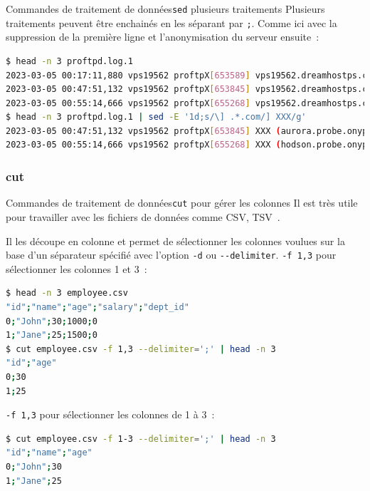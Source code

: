 \documentclass{beamer}
\begin{document}
    \begin{frame}[fragile]{Commandes de traitement de données}{\lstinline{sed} plusieurs traitements}
        Plusieurs traitements peuvent être enchainés en les séparant par \lstinline{;}.
        Comme ici avec la suppression de la première ligne et l'anonymisation du serveur ensuite~:
        \begin{lstlisting}[language=bash,basicstyle=\tiny\ttfamily]
$ head -n 3 proftpd.log.1
2023-03-05 00:17:11,880 vps19562 proftpX[653589] vps19562.dreamhostps.com: ProFTPD 1.3.6c (maint) (built Thu Feb 27 2020 19:34:56 UTC) standalone mode STARTUP
2023-03-05 00:47:51,132 vps19562 proftpX[653845] vps19562.dreamhostps.com (aurora.probe.onyphe.net[142.4.218.114]): USER anonymous: no such user found from aurora.probe.onyphe.net [142.4.218.114] to~::ffff:66.33.201.239:21
2023-03-05 00:55:14,666 vps19562 proftpX[655268] vps19562.dreamhostps.com (hodson.probe.onyphe.net[178.32.197.87]): USER anonymous: no such user found from hodson.probe.onyphe.net [178.32.197.87] to~::ffff:66.33.201.239:21
$ head -n 3 proftpd.log.1 | sed -E '1d;s/\] .*.com/] XXX/g'
2023-03-05 00:47:51,132 vps19562 proftpX[653845] XXX (aurora.probe.onyphe.net[142.4.218.114]): USER anonymous: no such user found from aurora.probe.onyphe.net [142.4.218.114] to~::ffff:66.33.201.239:21
2023-03-05 00:55:14,666 vps19562 proftpX[655268] XXX (hodson.probe.onyphe.net[178.32.197.87]): USER anonymous: no such user found from hodson.probe.onyphe.net [178.32.197.87] to~::ffff:66.33.201.239:21
        \end{lstlisting}
    \end{frame}

    \subsubsection{cut}\label{subsubsec:cut}
    \begin{frame}[fragile]{Commandes de traitement de données}{\lstinline{cut} pour gérer les colonnes}
        Il est très utile pour travailler avec les fichiers de données comme CSV, TSV~.

        Il les découpe en colonne et permet de sélectionner les colonnes voulues sur la base d'un séparateur spécifié avec l'option \lstinline{-d} ou \lstinline{--delimiter}.
        \bigbreak
        \lstinline{-f 1,3} pour sélectionner les colonnes 1 et 3~:
        \begin{lstlisting}[language=bash,basicstyle=\tiny\ttfamily]
$ head -n 3 employee.csv
"id";"name";"age";"salary";"dept_id"
0;"John";30;1000;0
1;"Jane";25;1500;0
$ cut employee.csv -f 1,3 --delimiter=';' | head -n 3
"id";"age"
0;30
1;25
        \end{lstlisting}
        \lstinline{-f 1,3} pour sélectionner les colonnes de 1 à 3~:
        \begin{lstlisting}[language=bash,basicstyle=\tiny\ttfamily]
$ cut employee.csv -f 1-3 --delimiter=';' | head -n 3
"id";"name";"age"
0;"John";30
1;"Jane";25
        \end{lstlisting}
    \end{frame}
\end{document}

